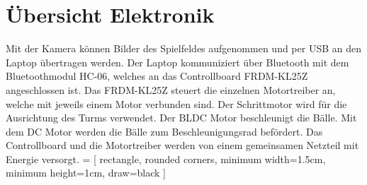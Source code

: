 \section{Übersicht Elektronik}
Mit der Kamera können Bilder des Spielfeldes aufgenommen und per USB an den 
Laptop übertragen werden. Der Laptop kommuniziert über Bluetooth mit dem 
Bluetoothmodul HC-06, welches an das Controllboard FRDM-KL25Z angeschlossen 
ist. Das FRDM-KL25Z steuert die einzelnen Motortreiber an, welche mit jeweils 
einem Motor verbunden sind. Der Schrittmotor wird für die Ausrichtung des 
Turms verwendet. Der BLDC Motor beschleunigt die Bälle. Mit dem DC Motor 
werden die Bälle zum Beschleunigungsrad befördert. Das Controllboard und die 
Motortreiber werden von einem gemeinsamen Netzteil mit Energie versorgt. 
 = [ rectangle, rounded corners, minimum width=1.5cm, minimum height=1cm, draw=black ]
